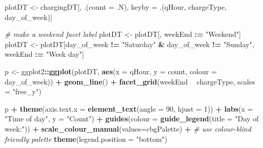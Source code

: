 \documentclass[]{article}
\newenvironment{Shaded}{\begin{snugshade}}{\end{snugshade}}
\newcommand{\KeywordTok}[1]{\textcolor[rgb]{0.13,0.29,0.53}{\textbf{#1}}}
\newcommand{\DataTypeTok}[1]{\textcolor[rgb]{0.13,0.29,0.53}{#1}}
\newcommand{\DecValTok}[1]{\textcolor[rgb]{0.00,0.00,0.81}{#1}}
\newcommand{\StringTok}[1]{\textcolor[rgb]{0.31,0.60,0.02}{#1}}
\newcommand{\CommentTok}[1]{\textcolor[rgb]{0.56,0.35,0.01}{\textit{#1}}}
\newcommand{\OperatorTok}[1]{\textcolor[rgb]{0.81,0.36,0.00}{\textbf{#1}}}
\newcommand{\ErrorTok}[1]{\textcolor[rgb]{0.64,0.00,0.00}{\textbf{#1}}}
\newcommand{\NormalTok}[1]{#1}
\begin{document}
\begin{Shaded}
\begin{Highlighting}[]
\NormalTok{plotDT <-}\StringTok{ }\NormalTok{chargingDT[, .(}\DataTypeTok{count =}\NormalTok{ .N), keyby =}\StringTok{ }\NormalTok{.(qHour, chargeType, day_of_week)]}

\CommentTok{# make a weekend facet label}
\NormalTok{plotDT <-}\StringTok{ }\NormalTok{plotDT[, weekEnd }\OperatorTok{:}\ErrorTok{=}\StringTok{ "Weekend"}\NormalTok{]}
\NormalTok{plotDT <-}\StringTok{ }\NormalTok{plotDT[day_of_week }\OperatorTok{!=}\StringTok{ "Saturday"} \OperatorTok{&}\StringTok{ }\NormalTok{day_of_week }\OperatorTok{!=}\StringTok{ "Sunday"}\NormalTok{, weekEnd }\OperatorTok{:}\ErrorTok{=}\StringTok{ "Week day"}\NormalTok{]}

\NormalTok{p <-}\StringTok{ }\NormalTok{ggplot2}\OperatorTok{::}\KeywordTok{ggplot}\NormalTok{(plotDT, }\KeywordTok{aes}\NormalTok{(}\DataTypeTok{x =}\NormalTok{ qHour, }\DataTypeTok{y =}\NormalTok{ count, }\DataTypeTok{colour =}\NormalTok{ day_of_week)) }\OperatorTok{+}
\StringTok{  }\KeywordTok{geom_line}\NormalTok{() }\OperatorTok{+}
\StringTok{  }\KeywordTok{facet_grid}\NormalTok{(weekEnd }\OperatorTok{~}\StringTok{  }\NormalTok{chargeType, }\DataTypeTok{scales =} \StringTok{"free_y"}\NormalTok{)}
  
\NormalTok{p }\OperatorTok{+}\StringTok{ }\KeywordTok{theme}\NormalTok{(}\DataTypeTok{axis.text.x =} \KeywordTok{element_text}\NormalTok{(}\DataTypeTok{angle =} \DecValTok{90}\NormalTok{, }\DataTypeTok{hjust =} \DecValTok{1}\NormalTok{)) }\OperatorTok{+}\StringTok{ }
\StringTok{  }\KeywordTok{labs}\NormalTok{(}\DataTypeTok{x =} \StringTok{"Time of day"}\NormalTok{,}
       \DataTypeTok{y =} \StringTok{"Count"}\NormalTok{) }\OperatorTok{+}
\StringTok{  }\KeywordTok{guides}\NormalTok{(}\DataTypeTok{colour =} \KeywordTok{guide_legend}\NormalTok{(}\DataTypeTok{title =} \StringTok{"Day of week:"}\NormalTok{)) }\OperatorTok{+}
\StringTok{  }\KeywordTok{scale_colour_manual}\NormalTok{(}\DataTypeTok{values=}\NormalTok{cbgPalette) }\OperatorTok{+}\StringTok{ }\CommentTok{# use colour-blind friendly palette}
\StringTok{  }\KeywordTok{theme}\NormalTok{(}\DataTypeTok{legend.position =} \StringTok{"bottom"}\NormalTok{)}
\end{Highlighting}
\end{Shaded}
\end{document}
